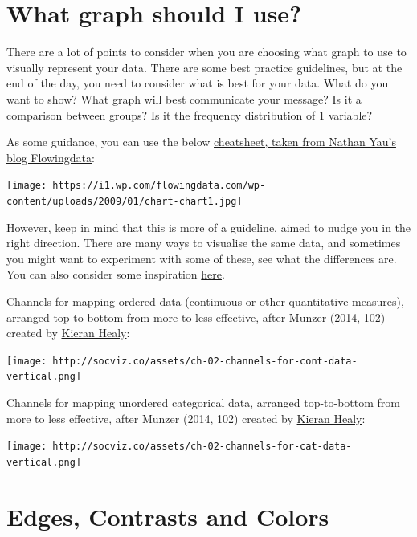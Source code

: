 \documentclass[]{book}
\theoremstyle{definition}
\theoremstyle{definition}
\theoremstyle{definition}
\theoremstyle{remark}
\begin{document}
\hypertarget{what-graph-should-i-use}{%
\section{What graph should I use?}\label{what-graph-should-i-use}}

There are a lot of points to consider when you are choosing what graph
to use to visually represent your data. There are some best practice
guidelines, but at the end of the day, you need to consider what is best
for your data. What do you want to show? What graph will best
communicate your message? Is it a comparison between groups? Is it the
frequency distribution of 1 variable?

As some guidance, you can use the below
\href{https://flowingdata.com/2009/01/15/flow-chart-shows-you-what-chart-to-use/}{cheatsheet,
taken from Nathan Yau's blog Flowingdata}:

\texttt{[image: https://i1.wp.com/flowingdata.com/wp-content/uploads/2009/01/chart-chart1.jpg]}

However, keep in mind that this is more of a guideline, aimed to nudge
you in the right direction. There are many ways to visualise the same
data, and sometimes you might want to experiment with some of these, see
what the differences are. You can also consider some inspiration
\href{http://datavizproject.com/}{here}.

Channels for mapping ordered data (continuous or other quantitative
measures), arranged top-to-bottom from more to less effective, after
Munzer (2014, 102) created by \href{http://socviz.co/}{Kieran Healy}:

\texttt{[image: http://socviz.co/assets/ch-02-channels-for-cont-data-vertical.png]}

Channels for mapping unordered categorical data, arranged top-to-bottom
from more to less effective, after Munzer (2014, 102) created by
\href{http://socviz.co/}{Kieran Healy}:

\texttt{[image: http://socviz.co/assets/ch-02-channels-for-cat-data-vertical.png]}

\hypertarget{edges-contrasts-and-colors}{%
\section{Edges, Contrasts and Colors}\label{edges-contrasts-and-colors}}
\end{document}
